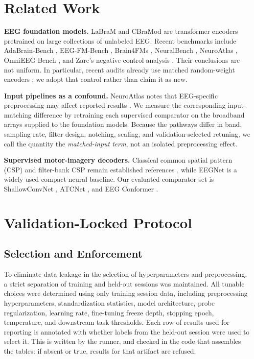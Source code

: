 \documentclass[conference]{IEEEtran}
\begin{document}
\section{Related Work}

\textbf{EEG foundation models.}
LaBraM \cite{jiang2024labram} and CBraMod \cite{wang2025cbramod} are transformer encoders pretrained on large collections of unlabeled EEG. Recent benchmarks include AdaBrain-Bench \cite{wu2025adabrainbench}, EEG-FM-Bench \cite{xiong2025eegfmbench}, Brain4FMs \cite{shen2026brain4fms}, NeuralBench \cite{banville2026neuralbench}, NeuroAtlas \cite{kontras2026neuroatlas}, OmniEEG-Bench \cite{lu2026omnieegbench}, and Zare's negative-control analysis \cite{zare2026negativecontrol}. Their conclusions are not uniform. In particular, recent audits already use matched random-weight encoders \cite{kontras2026neuroatlas,banville2026neuralbench,zare2026negativecontrol}; we adopt that control rather than claim it as new.

\textbf{Input pipelines as a confound.}
NeuroAtlas notes that EEG-specific preprocessing may affect reported results \cite{kontras2026neuroatlas}. We measure the corresponding input-matching difference by retraining each supervised comparator on the broadband arrays supplied to the foundation models. Because the pathways differ in band, sampling rate, filter design, notching, scaling, and validation-selected retuning, we call the quantity the \emph{matched-input term}, not an isolated preprocessing effect.

\textbf{Supervised motor-imagery decoders.}
Classical common spatial pattern (CSP) and filter-bank CSP remain established references \cite{ramoser2000csp,ang2008fbcsp}, while EEGNet \cite{lawhern2018eegnet} is a widely used compact neural baseline. Our evaluated comparator set is ShallowConvNet \cite{schirrmeister2017deep}, ATCNet \cite{altaheri2023atcnet}, and EEG Conformer \cite{song2023conformer}.


\section{Validation-Locked Protocol}

\subsection{Selection and Enforcement}

To eliminate data leakage in the selection of hyperparameters and preprocessing, a strict separation of training and held-out sessions was maintained. All tunable choices were determined using only training session data, including preprocessing hyperparameters, standardization statistics, model architecture, probe regularization, learning rate, fine-tuning freeze depth, stopping epoch, temperature, and downstream task thresholds. Each row of results used for reporting is annotated with whether labels from the held-out session were used to select it. This is written by the runner, and checked in the code that assembles the tables: if absent or true, results for that artifact are refused.
\end{document}
